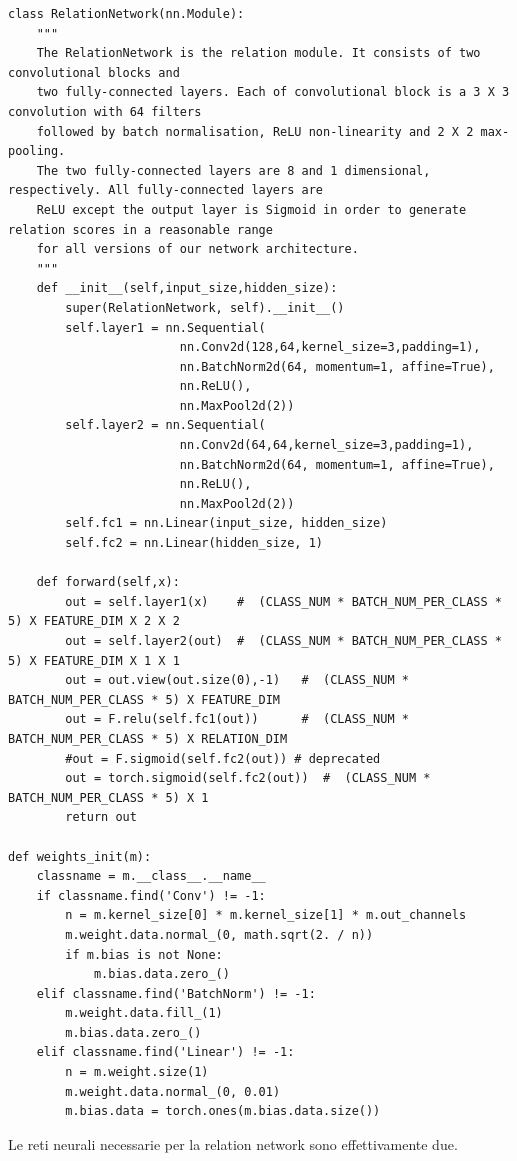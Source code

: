 \documentclass[12pt,a4paper,titlepage]{article}
\begin{document}
\begin{lstlisting}[language=iPython,firstnumber=1, caption=relation\_network.py, label=relation network,captionpos=b]
class RelationNetwork(nn.Module):
    """
    The RelationNetwork is the relation module. It consists of two convolutional blocks and
    two fully-connected layers. Each of convolutional block is a 3 X 3 convolution with 64 filters 
    followed by batch normalisation, ReLU non-linearity and 2 X 2 max-pooling.
    The two fully-connected layers are 8 and 1 dimensional, respectively. All fully-connected layers are
    ReLU except the output layer is Sigmoid in order to generate relation scores in a reasonable range 
    for all versions of our network architecture.
    """
    def __init__(self,input_size,hidden_size):
        super(RelationNetwork, self).__init__()
        self.layer1 = nn.Sequential(
                        nn.Conv2d(128,64,kernel_size=3,padding=1),
                        nn.BatchNorm2d(64, momentum=1, affine=True),
                        nn.ReLU(),
                        nn.MaxPool2d(2))
        self.layer2 = nn.Sequential(
                        nn.Conv2d(64,64,kernel_size=3,padding=1),
                        nn.BatchNorm2d(64, momentum=1, affine=True),
                        nn.ReLU(),
                        nn.MaxPool2d(2))
        self.fc1 = nn.Linear(input_size, hidden_size)
        self.fc2 = nn.Linear(hidden_size, 1)

    def forward(self,x):
        out = self.layer1(x)    #  (CLASS_NUM * BATCH_NUM_PER_CLASS * 5) X FEATURE_DIM X 2 X 2
        out = self.layer2(out)  #  (CLASS_NUM * BATCH_NUM_PER_CLASS * 5) X FEATURE_DIM X 1 X 1
        out = out.view(out.size(0),-1)   #  (CLASS_NUM * BATCH_NUM_PER_CLASS * 5) X FEATURE_DIM
        out = F.relu(self.fc1(out))      #  (CLASS_NUM * BATCH_NUM_PER_CLASS * 5) X RELATION_DIM
        #out = F.sigmoid(self.fc2(out)) # deprecated
        out = torch.sigmoid(self.fc2(out))  #  (CLASS_NUM * BATCH_NUM_PER_CLASS * 5) X 1
        return out

def weights_init(m):
    classname = m.__class__.__name__
    if classname.find('Conv') != -1:
        n = m.kernel_size[0] * m.kernel_size[1] * m.out_channels
        m.weight.data.normal_(0, math.sqrt(2. / n))
        if m.bias is not None:
            m.bias.data.zero_()
    elif classname.find('BatchNorm') != -1:
        m.weight.data.fill_(1)
        m.bias.data.zero_()
    elif classname.find('Linear') != -1:
        n = m.weight.size(1)
        m.weight.data.normal_(0, 0.01)
        m.bias.data = torch.ones(m.bias.data.size())
\end{lstlisting}
Le reti neurali necessarie per la relation network sono effettivamente due.
\end{document}
